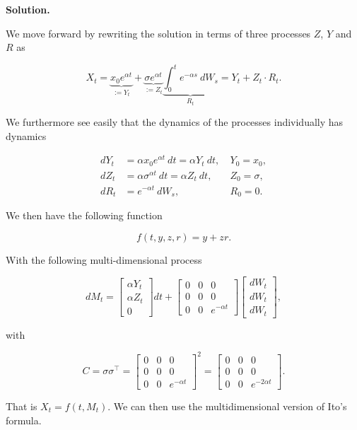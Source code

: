 \documentclass[
]{book}
\begin{document}
\textbf{Solution.}

We move forward by rewriting the solution in terms of three processes \(Z\), \(Y\) and \(R\) as

\[
X_t=\underbrace{x_0e^{\alpha t}}_{:=Y_t}+\underbrace{\sigma e^{\alpha t}}_{:=Z_t} \underbrace{\int_0^t e^{-\alpha s}\ dW_s}_{R_t}=Y_t+Z_t\cdot R_t.
\]

We furthermore see easily that the dynamics of the processes individually has dynamics

\begin{align*}
d Y_t&=\alpha x_0e^{\alpha t}\ dt=\alpha Y_t\ dt,\ &Y_0=x_0,\\
d Z_t&=\alpha \sigma^{\alpha t}\ dt=\alpha Z_t\ dt,\ &Z_0=\sigma,\\
d R_t&=e^{-\alpha t}\ dW_s,\ &R_0=0.
\end{align*}

We then have the following function

\[
f\left(t,y,z,r\right)=y+zr.
\]

With the following multi-dimensional process

\[
dM_t=\begin{bmatrix}\alpha Y_t\\ \alpha Z_t\\ 0\end{bmatrix}dt+\begin{bmatrix}0 &0  &0 \\ 0 & 0 &0 \\ 0 & 0 & e^{-\alpha t}\end{bmatrix}\begin{bmatrix}dW_t\\ dW_t\\ dW_t\end{bmatrix},
\]

with

\[
C=\sigma \sigma^\top =\begin{bmatrix}0 &0  &0 \\ 0 & 0 &0 \\ 0 & 0 & e^{-\alpha t}\end{bmatrix}^2=\begin{bmatrix}0 &0  &0 \\ 0 & 0 &0 \\ 0 & 0 & e^{-2\alpha t}\end{bmatrix}.
\]

That is \(X_t=f(t,M_t)\). We can then use the multidimensional version of Ito's formula.
\end{document}
